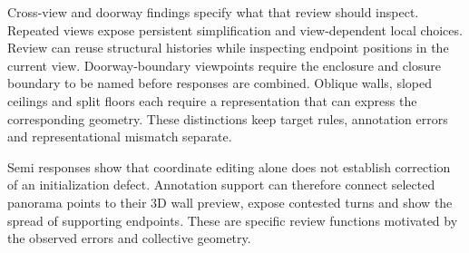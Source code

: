 Cross-view and doorway findings specify what that review should inspect. Repeated views expose persistent simplification and view-dependent local choices. Review can reuse structural histories while inspecting endpoint positions in the current view. Doorway-boundary viewpoints require the enclosure and closure boundary to be named before responses are combined. Oblique walls, sloped ceilings and split floors each require a representation that can express the corresponding geometry. These distinctions keep target rules, annotation errors and representational mismatch separate.

Semi responses show that coordinate editing alone does not establish correction of an initialization defect. Annotation support can therefore connect selected panorama points to their 3D wall preview, expose contested turns and show the spread of supporting endpoints. These are specific review functions motivated by the observed errors and collective geometry.
